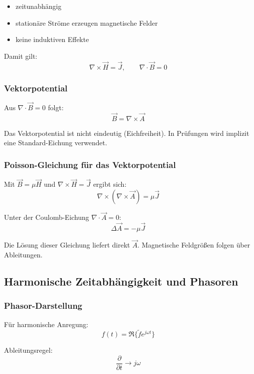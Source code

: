 \documentclass[a4paper]{article}
\newcommand{\Hf}{\vec H}
\newcommand{\B}{\vec B}
\newcommand{\J}{\vec J}
\newcommand{\A}{\vec A}
\begin{document}
\begin{itemize}
  \item zeitunabhängig
  \item stationäre Ströme erzeugen magnetische Felder
  \item keine induktiven Effekte
\end{itemize}

Damit gilt:
\[
\nabla \times \Hf = \J,
\qquad
\nabla \cdot \B = 0
\]

\subsubsection{Vektorpotential}

Aus $\nabla \cdot \B = 0$ folgt:
\[
\B = \nabla \times \A
\]

\begin{merke}
Das Vektorpotential ist nicht eindeutig (Eichfreiheit).
In Prüfungen wird implizit eine Standard-Eichung verwendet.
\end{merke}

\subsubsection{Poisson-Gleichung für das Vektorpotential}

Mit $\B = \mu \Hf$ und $\nabla \times \Hf = \J$ ergibt sich:
\[
\nabla \times (\nabla \times \A) = \mu \J
\]

Unter der Coulomb-Eichung $\nabla \cdot \A = 0$:
\[
\Delta \A = -\mu \J
\]

\begin{checkitem}
Die Lösung dieser Gleichung liefert direkt $\A$.
Magnetische Feldgrößen folgen über Ableitungen.
\end{checkitem}

\subsection{Harmonische Zeitabhängigkeit und Phasoren}

\subsubsection{Phasor-Darstellung}

Für harmonische Anregung:
\[
f(t) = \Re\{\tilde f e^{j\omega t}\}
\]

Ableitungsregel:
\[
\frac{\partial}{\partial t} \rightarrow j\omega
\]
\end{document}

